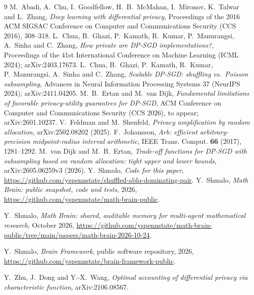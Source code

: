 \documentclass[11pt]{amsart}
\theoremstyle{definition}
\theoremstyle{remark}
\begin{document}
\begin{thebibliography}{9}
 M.~Abadi, A.~Chu, I.~Goodfellow, H.~B.~McMahan, I.~Mironov, K.~Talwar and L.~Zhang, \emph{Deep learning with differential privacy}, Proceedings of the 2016 ACM SIGSAC Conference on Computer and Communications Security (CCS 2016), 308--318.
L.~Chua, B.~Ghazi, P.~Kamath, R.~Kumar, P.~Manurangsi, A.~Sinha and C.~Zhang, \emph{How private are DP-SGD implementations?}, Proceedings of the 41st International Conference on Machine Learning (ICML 2024); arXiv:2403.17673.
 L.~Chua, B.~Ghazi, P.~Kamath, R.~Kumar, P.~Manurangsi, A.~Sinha and C.~Zhang, \emph{Scalable DP-SGD: shuffling vs.\ Poisson subsampling}, Advances in Neural Information Processing Systems 37 (NeurIPS 2024); arXiv:2411.04205.
 M.~B.~Ertan and M.~van Dijk, \emph{Fundamental limitations of favorable privacy-utility guarantees for DP-SGD}, ACM Conference on Computer and Communications Security (CCS 2026), to appear; arXiv:2601.10237.
 V.~Feldman and M.~Shenfeld, \emph{Privacy amplification by random allocation}, arXiv:2502.08202 (2025).
 F.~Johansson, \emph{Arb: efficient arbitrary-precision midpoint-radius interval arithmetic}, IEEE Trans. Comput. \textbf{66} (2017), 1281--1292.
 M.~van Dijk and M.~B.~Ertan, \emph{Trade-off functions for DP-SGD with subsampling based on random allocation: tight upper and lower bounds}, arXiv:2605.06259v3 (2026).
 Y.~Shmalo, \emph{Code for this paper}, \url{https://github.com/yspennstate/shuffled-ablq-dominating-pair}.
 Y.~Shmalo, \emph{Math Brain: public snapshot, code and tests}, 2026, \url{https://github.com/yspennstate/math-brain-public}.

 Y.~Shmalo, \emph{Math Brain: shared, auditable memory for multi-agent mathematical research}, October 2026, \url{https://github.com/yspennstate/math-brain-public/tree/main/papers/math-brain-2026-10-24}.

 Y.~Shmalo, \emph{Brain Framework}, public software repository, 2026, \url{https://github.com/yspennstate/brain-framework-public}.

 Y.~Zhu, J.~Dong and Y.-X.~Wang, \emph{Optimal accounting of differential privacy via characteristic function}, arXiv:2106.08567.
\end{thebibliography}
\end{document}

